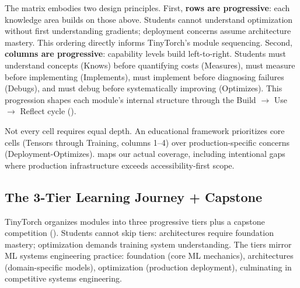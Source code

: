 \documentclass[10pt,twocolumn]{article}
\begin{document}
The matrix embodies two design principles. First, \textbf{rows are progressive}: each knowledge area builds on those above. Students cannot understand optimization without first understanding gradients; deployment concerns assume architecture mastery. This ordering directly informs TinyTorch's module sequencing. Second, \textbf{columns are progressive}: capability levels build left-to-right. Students must understand concepts (Knows) before quantifying costs (Measures), must measure before implementing (Implements), must implement before diagnosing failures (Debugs), and must debug before systematically improving (Optimizes). This progression shapes each module's internal structure through the Build $\rightarrow$ Use $\rightarrow$ Reflect cycle ().

Not every cell requires equal depth. An educational framework prioritizes core cells (Tensors through Training, columns 1--4) over production-specific concerns (Deployment-Optimizes).  maps our actual coverage, including intentional gaps where production infrastructure exceeds accessibility-first scope.

\subsection{The 3-Tier Learning Journey + Capstone}

TinyTorch organizes modules into three progressive tiers plus a capstone competition (). Students cannot skip tiers: architectures require foundation mastery; optimization demands training system understanding. The tiers mirror ML systems engineering practice: foundation (core ML mechanics), architectures (domain-specific models), optimization (production deployment), culminating in competitive systems engineering.
\end{document}
